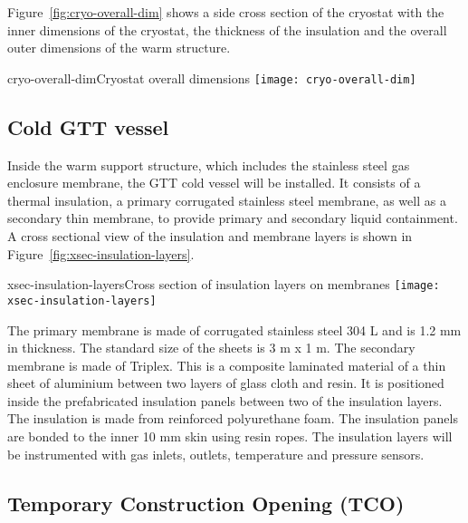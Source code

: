 Figure~\ref{fig:cryo-overall-dim} shows a side cross section of the cryostat with the inner dimensions of the cryostat, 
the thickness of the insulation 
and the overall outer dimensions of the warm structure.

\begin{cdrfigure}{cryo-overall-dim}{Cryostat overall dimensions}
  \texttt{[image: cryo-overall-dim]}
\end{cdrfigure}


\subsection{Cold GTT vessel}

Inside the warm support structure, which includes the stainless steel gas enclosure membrane, the GTT cold vessel will be installed. It consists of a thermal insulation, a primary corrugated stainless steel membrane, as well as a secondary thin membrane, to provide primary and secondary liquid containment. A cross sectional view of the insulation and membrane layers is shown in Figure~\ref{fig:xsec-insulation-layers}.

\begin{cdrfigure}{xsec-insulation-layers}{Cross section of insulation layers on membranes}
  \texttt{[image: xsec-insulation-layers]}
\end{cdrfigure}


The primary membrane is made of corrugated stainless steel 304 L and is 1.2 mm in thickness.  The standard size of the sheets is 3 m x 1 m.  The secondary membrane is made of Triplex.  This is a composite laminated material of a thin sheet of aluminium between two layers of glass cloth and resin.  It is positioned inside the prefabricated insulation panels between two of the insulation layers.    The insulation is made from reinforced polyurethane foam.  The insulation panels are bonded to the inner 10 mm skin using resin ropes.  The insulation layers will be instrumented with gas inlets, outlets, temperature and pressure sensors.


\subsection{Temporary Construction Opening (TCO)}

